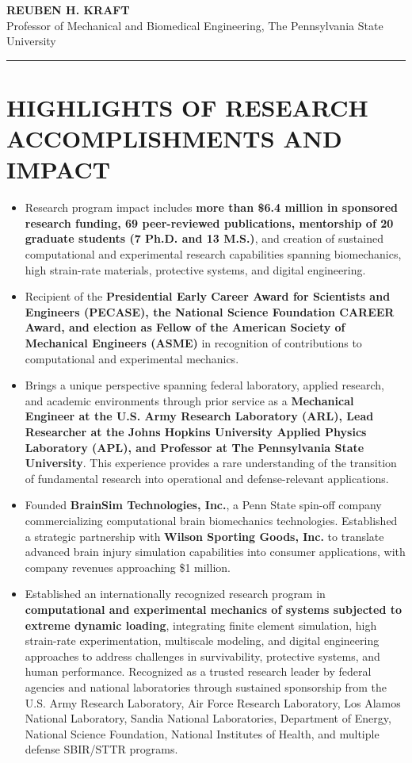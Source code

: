 \documentclass[a4paper,10pt]{article}
\author{}
\date{}
\begin{document}
\thispagestyle{firstpage}

\begin{center}
\LARGE \textbf{\textsc{REUBEN H. KRAFT}} \\
\normalsize Professor of Mechanical and Biomedical Engineering, The Pennsylvania State University \\
\rule{\linewidth}{2pt}
\end{center}
\normalsize


\section*{HIGHLIGHTS OF RESEARCH ACCOMPLISHMENTS AND IMPACT}
\begin{itemize}[leftmargin=*, itemsep=0pt]
\item Research program impact includes \textbf{more than \$6.4 million in sponsored research funding, 69 peer-reviewed publications, mentorship of 20 graduate students (7 Ph.D. and 13 M.S.)}, and creation of sustained computational and experimental research capabilities spanning biomechanics, high strain-rate materials, protective systems, and digital engineering.
\item Recipient of the \textbf{Presidential Early Career Award for Scientists and Engineers (PECASE), the National Science Foundation CAREER Award, and election as Fellow of the American Society of Mechanical Engineers (ASME)} in recognition of contributions to computational and experimental mechanics.
\item Brings a unique perspective spanning federal laboratory, applied research, and academic environments through prior service as a \textbf{Mechanical Engineer at the U.S. Army Research Laboratory (ARL), Lead Researcher at the Johns Hopkins University Applied Physics Laboratory (APL), and Professor at The Pennsylvania State University}. This experience provides a rare understanding of the transition of fundamental research into operational and defense-relevant applications.
\item Founded \textbf{BrainSim Technologies, Inc.}, a Penn State spin-off company commercializing computational brain biomechanics technologies. Established a strategic partnership with \textbf{Wilson Sporting Goods, Inc.} to translate advanced brain injury simulation capabilities into consumer applications, with company revenues approaching \$1 million.
\item Established an internationally recognized research program in \textbf{computational and experimental mechanics of systems subjected to extreme dynamic loading}, integrating finite element simulation, high strain-rate experimentation, multiscale modeling, and digital engineering approaches to address challenges in survivability, protective systems, and human performance. Recognized as a trusted research leader by federal agencies and national laboratories through sustained sponsorship from the U.S. Army Research Laboratory, Air Force Research Laboratory, Los Alamos National Laboratory, Sandia National Laboratories, Department of Energy, National Science Foundation, National Institutes of Health, and multiple defense SBIR/STTR programs.

\end{itemize}
\end{document}
